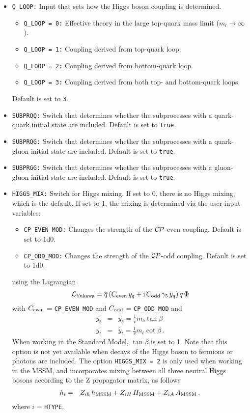 \documentclass[english,12pt]{article}
\newcommand{\ii}{\mathord{\mathrm{i}}}
\begin{document}
\begin{itemize}
\item {\tt Q\_LOOP:} Input that sets how the Higgs boson coupling is determined. 
  \begin{itemize}
   \item {\tt Q\_LOOP = 0:} Effective theory in the large top-quark mass limit
($m_{t} \rightarrow \infty$).
   \item {\tt Q\_LOOP = 1:} Coupling derived from top-quark loop.
   \item {\tt Q\_LOOP = 2:} Coupling derived from bottom-quark loop.
   \item {\tt Q\_LOOP = 3:} Coupling derived from both top- and bottom-quark loops.
  \end{itemize}
 Default is set to  {\tt 3}.
\item {\tt SUBPRQQ:} Switch that determines whether the subprocesses with a quark-quark initial
  state are included. Default is set to {\tt true}.  
\item {\tt SUBPRQG:} Switch that determines whether the subprocesses with a quark-gluon initial
  state are included. Default is set to {\tt true}.  
\item {\tt SUBPRGG:} Switch that determines whether the subprocesses with a gluon-gluon initial
  state are included. Default is set to {\tt true}.  

\item {\tt HIGGS\_MIX:} Switch for Higgs mixing.  If set to 0, there is no Higgs 
mixing, which is the default.  If set to 1, the mixing is determined via the user-input variables:
   \begin{itemize}
    \item {\tt CP\_EVEN\_MOD:} Changes the strength of the $\cal{CP}$-even
            coupling. Default is set to  1d0.
    \item {\tt CP\_ODD\_MOD:} Changes the strength of the $\cal{CP}$-odd
            coupling. Default is set to 1d0.
   \end{itemize}
  using the Lagrangian
   \begin{eqnarray}
     {\cal L}_{\rm Yukawa}=\overline{q} \, (C_{\rm even} \, y_q + \ii \,C_{\rm odd}\, \gamma_5 \,\tilde{y}_q)\, q\,  \Phi
   \end{eqnarray} 
 with $C_{\rm even}$ = {\tt CP\_EVEN\_MOD} and $C_{\rm odd}$ = {\tt CP\_ODD\_MOD} and
\begin{eqnarray}
 y_{b}  &=& \tilde{y_{b}} = \frac{1}{v} m_{b}\tan\beta  \nonumber \\
 y_{t}  &=& \tilde{y_{t}} = \frac{1}{v} m_{t}\cot\beta  \, .
\end{eqnarray}
When working in the Standard Model, $\tan \beta$ is set to 1.  Note that this
option is not yet available when decays of the Higgs boson to fermions or photons are included. The
option {\tt HIGGS\_MIX~=~2} is only used when working in the MSSM, and
incorporates mixing between all three neutral Higgs bosons according to the Z
propagator matrix, as follows
 \begin{eqnarray}
   h_{i} &=& Z_{ih} \, h_{\rm MSSM} + Z_{iH}\, H_{\rm MSSM} + Z_{iA}\, A_{\rm MSSM} \,,
 \end{eqnarray}
 where $i$ = {\tt HTYPE}.



\end{itemize}
\end{document}
